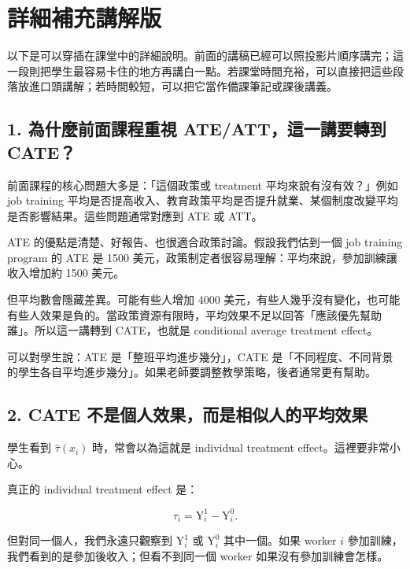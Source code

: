 \documentclass[
  chinese,
  11pt,
]{article}
\begin{document}
\section{詳細補充講解版}\label{ux8a73ux7d30ux88dcux5145ux8b1bux89e3ux7248}

以下是可以穿插在課堂中的詳細說明。前面的講稿已經可以照投影片順序講完；這一段則把學生最容易卡住的地方再講白一點。若課堂時間充裕，可以直接把這些段落放進口頭講解；若時間較短，可以把它當作備課筆記或課後講義。

\subsection{1. 為什麼前面課程重視 ATE/ATT，這一講要轉到
CATE？}\label{ux70baux4ec0ux9ebcux524dux9762ux8ab2ux7a0bux91cdux8996-ateattux9019ux4e00ux8b1bux8981ux8f49ux5230-cate}

前面課程的核心問題大多是：「這個政策或 treatment
平均來說有沒有效？」例如 job training
平均是否提高收入、教育政策平均是否提升就業、某個制度改變平均是否影響結果。這些問題通常對應到
ATE 或 ATT。

ATE 的優點是清楚、好報告、也很適合政策討論。假設我們估到一個 job
training program 的 ATE 是 1500
美元，政策制定者很容易理解：平均來說，參加訓練讓收入增加約 1500 美元。

但平均數會隱藏差異。可能有些人增加 4000
美元，有些人幾乎沒有變化，也可能有些人效果是負的。當政策資源有限時，平均效果不足以回答「應該優先幫助誰」。所以這一講轉到
CATE，也就是 conditional average treatment effect。

可以對學生說：ATE 是「整班平均進步幾分」，CATE
是「不同程度、不同背景的學生各自平均進步幾分」。如果老師要調整教學策略，後者通常更有幫助。

\subsection{2. CATE
不是個人效果，而是相似人的平均效果}\label{cate-ux4e0dux662fux500bux4ebaux6548ux679cux800cux662fux76f8ux4f3cux4ebaux7684ux5e73ux5747ux6548ux679c}

學生看到 \(\hat{\tau}(x_i)\) 時，常會以為這就是 individual treatment
effect。這裡要非常小心。

真正的 individual treatment effect 是：

\[
\tau_i=\mathrm{Y}^{1}_{i}-\mathrm{Y}^{0}_{i}.
\]

但對同一個人，我們永遠只觀察到 \(\mathrm{Y}^{1}_{i}\) 或
\(\mathrm{Y}^{0}_{i}\) 其中一個。如果 worker \(i\)
參加訓練，我們看到的是參加後收入；但看不到同一個 worker
如果沒有參加訓練會怎樣。
\end{document}
